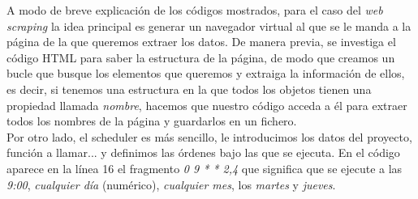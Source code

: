 A modo de breve explicación de los códigos mostrados, para el caso del \textit{web scraping} la idea principal es generar un navegador virtual al que se le manda a la página de la que queremos extraer los datos. De manera previa, se investiga el código HTML para saber la estructura de la página, de modo que creamos un bucle que busque los elementos que queremos y extraiga la información de ellos, es decir, si tenemos una estructura en la que todos los objetos tienen una propiedad llamada \textit{nombre}, hacemos que nuestro código acceda a él para extraer todos los nombres de la página y guardarlos en un fichero.\\

Por otro lado, el scheduler es más sencillo, le introducimos los datos del proyecto, función a llamar... y definimos las órdenes bajo las que se ejecuta. En el código aparece en la línea 16 el fragmento \textit{0 9 * * 2,4} que significa que se ejecute a las \textit{9:00}, \textit{cualquier día} (numérico), \textit{cualquier mes}, los \textit{martes} y \textit{jueves}.
%
%
